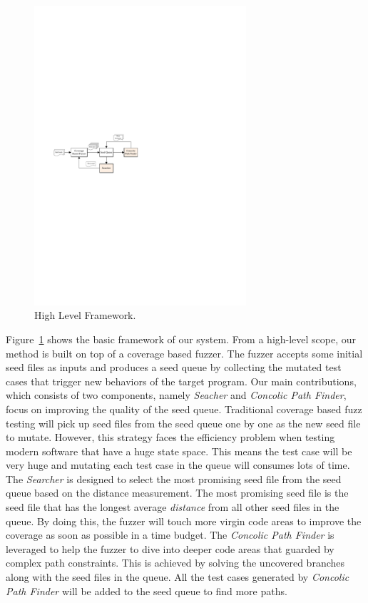 \begin{figure}
\centering
\includegraphics[width=0.7\textwidth]{figures/framework.pdf} 
\caption{High Level Framework.}\label{Framework}
\end{figure}


Figure~\ref{Framework} shows the basic framework of our system. From a high-level scope, our method is built on top of a coverage based fuzzer. 
The fuzzer accepts some initial seed files as inputs and produces a seed queue by collecting the mutated test cases that trigger new behaviors of the target program. 
Our main contributions, which consists of two components, namely \emph{Seacher} and \emph{Concolic Path Finder}, focus on improving the quality of the seed queue. 
Traditional coverage based fuzz testing will pick up seed files from the seed queue one by one as the new seed file to mutate. However, this strategy faces the efficiency problem when testing modern software that have a huge state space. This means the test case will be very huge and mutating each test case in the queue will consumes lots of time. The \emph{Searcher} is designed to select the most promising seed file from the seed queue based on the distance measurement. The most promising seed file is the seed file that has the longest average \textit{distance} from all other seed files in the queue. By doing this, the fuzzer will touch more virgin code areas to improve the coverage as soon as possible in a time budget. 
The \emph{Concolic Path Finder} is leveraged to help the fuzzer to dive into deeper code areas that guarded by complex path constraints. This is achieved by solving the uncovered branches along with the seed files in the queue. All the test cases generated by \emph{Concolic Path Finder} will be added to the seed queue to find more paths.

